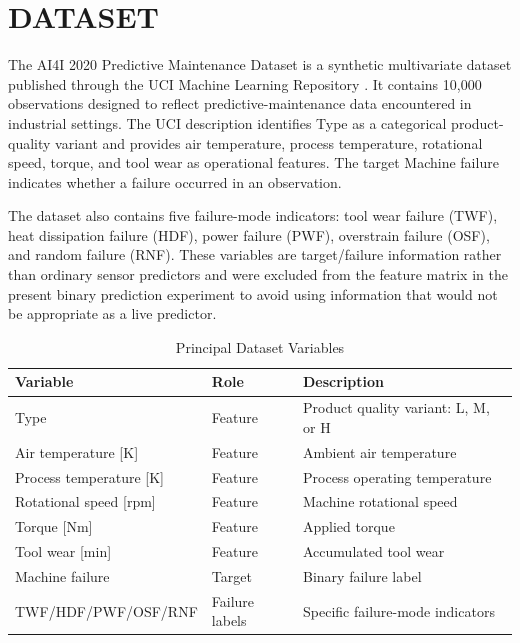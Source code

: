 \documentclass[conference]{IEEEtran}
\begin{document}
\section{DATASET}

The AI4I 2020 Predictive Maintenance Dataset is a synthetic multivariate dataset published through the UCI Machine Learning Repository \cite{uci2020ai4i}. It contains 10,000 observations designed to reflect predictive-maintenance data encountered in industrial settings. The UCI description identifies Type as a categorical product-quality variant and provides air temperature, process temperature, rotational speed, torque, and tool wear as operational features. The target Machine failure indicates whether a failure occurred in an observation.

The dataset also contains five failure-mode indicators: tool wear failure (TWF), heat dissipation failure (HDF), power failure (PWF), overstrain failure (OSF), and random failure (RNF). These variables are target/failure information rather than ordinary sensor predictors and were excluded from the feature matrix in the present binary prediction experiment to avoid using information that would not be appropriate as a live predictor.

\begin{table}[h]
\centering
\caption{Principal Dataset Variables}
\label{tab:variables}
\small
\begin{tabularx}{\columnwidth}{|l|l|X|}
\hline
\textbf{Variable} & \textbf{Role} & \textbf{Description} \\
\hline
Type & Feature & Product quality variant: L, M, or H \\
Air temperature [K] & Feature & Ambient air temperature \\
Process temperature [K] & Feature & Process operating temperature \\
Rotational speed [rpm] & Feature & Machine rotational speed \\
Torque [Nm] & Feature & Applied torque \\
Tool wear [min] & Feature & Accumulated tool wear \\
Machine failure & Target & Binary failure label \\
TWF/HDF/PWF/OSF/RNF & Failure labels & Specific failure-mode indicators \\
\hline
\end{tabularx}
\end{table}
\end{document}
